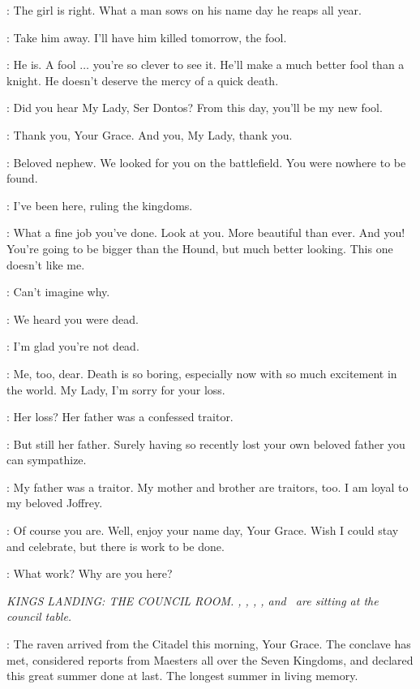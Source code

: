 \HOUND: The girl is right. What a man sows on his name day he reaps all year.

\JOFFREY: Take him away. I'll have him killed tomorrow, the fool.

\SANSA: He is. A fool $\ldots$ you're so clever to see it. He'll make a much better fool than a knight. He doesn't deserve the mercy of a quick death.

\JOFFREY: Did you hear My Lady, Ser Dontos? From this day, you'll be my new fool.

\DONTOS: Thank you, Your Grace. And you, My Lady, thank you.


\TYRION: Beloved nephew. We looked for you on the battlefield. You were nowhere to be found.

\JOFFREY: I've been here, ruling the kingdoms.

\TYRION: What a fine job you've done.   Look at you. More beautiful than ever.  And you! You're going to be bigger than the Hound, but much better looking.   This one doesn't like me.

\BRONN: Can't imagine why.

\JOFFREY: We heard you were dead.

\MYRCELLA: I'm glad you're not dead.

\TYRION: Me, too, dear. Death is so boring, especially now with so much excitement in the world.  My Lady, I'm sorry for your loss.

\JOFFREY: Her loss? Her father was a confessed traitor.

\TYRION: But still her father. Surely having so recently lost your own beloved father you can sympathize.

\SANSA: My father was a traitor. My mother and brother are traitors, too. I am loyal to my beloved Joffrey.

\TYRION: Of course you are. Well, enjoy your name day, Your Grace. Wish I could stay and celebrate, but there is work to be done.

\JOFFREY: What work? Why are you here?


\scene

\textit{KINGS LANDING: THE COUNCIL ROOM.  \CERSEI, \PYCELLE, \VARYS, \LITTLEFINGER, and \JANOSSLYNT ~are sitting at the council table.}

\PYCELLE: The raven arrived from the Citadel this morning, Your Grace. The conclave has met, considered reports from Maesters all over the Seven Kingdoms, and declared this great summer done at last. The longest summer in living memory.

